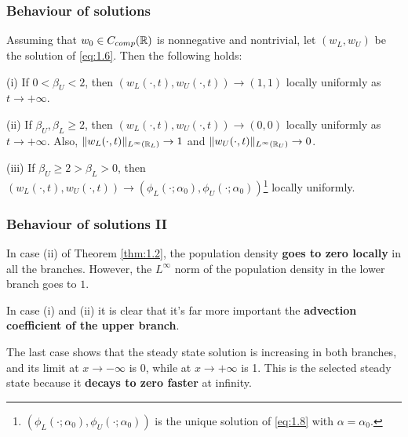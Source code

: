 \begin{frame}
    \frametitle{Behaviour of solutions}
    \begin{theorem}
        Assuming that \(w_0 \in C_{comp}(\mathbb{R})\) is nonnegative and nontrivial, let \((w_L, w_U)\) be the solution of \eqref{eq:1.6}. Then the following holds:

            (i) If \(0 < \beta_U < 2\), then \((w_L(\cdot, t), w_U(\cdot, t)) \to (1, 1)\) locally uniformly as \(t \to +\infty\).

            (ii) If \(\beta_U, \beta_L \geq 2\), then \((w_L(\cdot, t), w_U(\cdot, t)) \to (0, 0)\) locally uniformly as \(t \to +\infty\). Also, \(\lVert w_L(\cdot, t)\rVert_{L^\infty(\mathbb{R}_L)} \to 1\) and \(\lVert w_U(\cdot, t)\rVert_{L^\infty(\mathbb{R}_U)} \to 0\).

            (iii) If \(\beta_U \geq 2 > \beta_L > 0\), then \((w_L(\cdot, t), w_U(\cdot, t)) \to (\phi_L(\cdot; \alpha_0), \phi_U(\cdot; \alpha_0))\)\footnote{\((\phi_L(\cdot; \alpha_0), \phi_U(\cdot; \alpha_0))\) is the unique solution of \eqref{eq:1.8} with \(\alpha = \alpha_0\).} locally uniformly.
        \label{thm:1.2}
    \end{theorem}
\end{frame}


\begin{frame}
    \frametitle{Behaviour of solutions II}
    In case (ii) of Theorem \ref{thm:1.2}, the population density \textbf{goes to zero locally} in all the branches. However, the \(L^\infty\) norm of the population density in the lower branch goes to \(1\).

    In case (i) and (ii) it is clear that it's far more important the \textbf{advection coefficient of the upper branch}.

    The last case shows that the steady state solution is increasing in both branches, and its limit at \(x \to -\infty\) is 0, while at \(x \to +\infty\) is 1. This is the selected steady state because it \textbf{decays to zero faster} at infinity.
\end{frame}